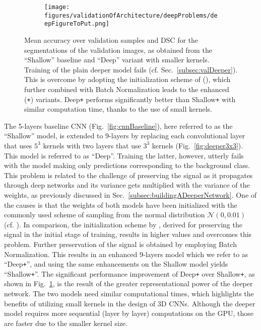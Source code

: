 \documentclass[preprint,authoryear,12pt]{elsarticle}
\newcommand{\quot}[1]{``#1''}
\begin{document}
\begin{figure}[!h]
\centering
\begin{subfigure}[b]{0.5\textwidth}
\centering
\texttt{[image: figures/validationOfArchitecture/deepProblems/deepFigureToPut.png]}
\end{subfigure}
\caption{Mean accuracy over validation samples and DSC for the segmentations of the validation images, as obtained from the \quot{Shallow} baseline and \quot{Deep} variant with smaller kernels. Training of the plain deeper model fails (cf. Sec.~\ref{subsec:valDeeper}). This is overcome by adopting the initialization scheme of (\cite{he2015delving}), which further combined with Batch Normalization leads to the enhanced (\texttt{+}) variants. Deep\texttt{+} performs significantly better than Shallow\texttt{+} with similar computation time, thanks to the use of small kernels.
}
\label{fig:deepProblems}
\end{figure}
%
 
The 5-layers baseline CNN (Fig.~\ref{fig:cnnBaseline}), here referred to as the \quot{Shallow} model, is extended to 9-layers by replacing each convolutional layer that uses $5^3$ kernels with two layers that use $3^3$ kernels (Fig.~\ref{fig:deeper3x3}). This model is referred to as \quot{Deep}. Training the latter, however, utterly fails with the model making only predictions corresponding to the background class. This problem is related to the challenge of preserving the signal as it propagates through deep networks and its variance gets multiplied with the variance of the weights, as previously discussed in Sec.~\ref{subsec:buildingADeeperNetwork}. One of the causes is that the weights of both models have been initialized with the commonly used scheme of sampling from the normal distribution $\mathcal{N}(0,0.01)$ (cf. \cite{Krizhevsky2012}). In comparison, the initialization scheme by \cite{he2015delving}, derived for preserving the signal in the initial stage of training, results in higher values and overcomes this problem. Further preservation of the signal is obtained by employing Batch Normalization. This results in an enhanced 9-layers model which we refer to as \quot{Deep\texttt{+}}, and using the same enhancements on the Shallow model yields \quot{Shallow\texttt{+}}. The significant performance improvement of Deep\texttt{+} over Shallow\texttt{+}, as shown in Fig.~\ref{fig:deepProblems}, is the result of the greater representational power of the deeper network. The two models need similar computational times, which highlights the benefits of utilizing small kernels in the design of 3D CNNs. Although the deeper model requires more sequential (layer by layer) computations on the GPU, those are faster due to the smaller kernel size.
\end{document}
